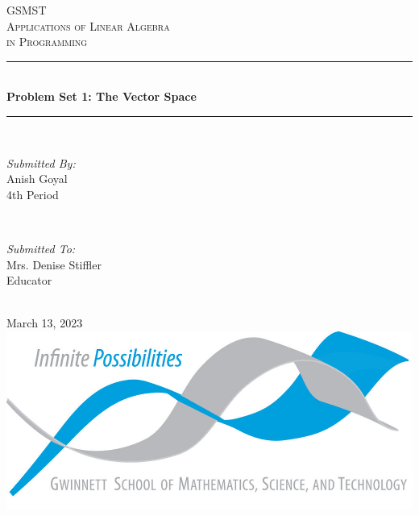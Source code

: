 \begin{titlepage}

    \newcommand{\HRule}{\rule{\linewidth}{0.5mm}}
    
    \center
    
    \textsc{\LARGE GSMST }\\[0.3cm]
    \textsc{\Large Applications of Linear Algebra }\\[0.3cm]
    \textsc{\Large in Programming}\\[0.5cm]
    
    \HRule \\[0.4cm]
    { \huge \bfseries Problem Set 1: The Vector Space}\\[0.03cm]
    \HRule \\[1.5cm]
    
    \begin{minipage}{0.4\textwidth}
    \begin{flushleft} \large
    \emph{Submitted By:}\\
    Anish Goyal \\4th Period
    \end{flushleft}
    \end{minipage}
    ~
    \begin{minipage}{0.4\textwidth}
    \begin{flushright} \large
    \emph{Submitted To:} \\
    Mrs. Denise Stiffler\\Educator
    \end{flushright}
    \end{minipage}\\[1cm]
    
    {\large March 13, 2023}\\[1cm]
    
    \includegraphics{logo.png}\\[1cm]
    \vfill
    \end{titlepage}